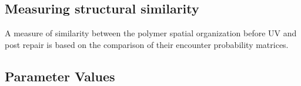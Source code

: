 \documentclass[12pt]{article}
\begin{document}
	\subsection{Measuring structural similarity}
	A measure of similarity between the polymer spatial organization before UV and post repair is based on the comparison of their encounter probability matrices.
	
	
	\subsection{Parameter Values}
	
	
\end{document}
